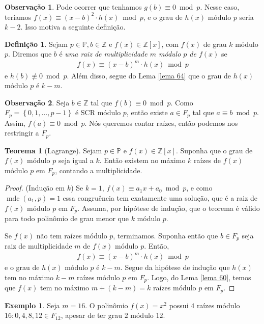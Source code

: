\documentclass[a4paper,11pt,twoside, leqno]{article}
\DeclareMathOperator{\mdc}{mdc}
\theoremstyle{definition}
\newtheorem{theorem}{Teorema}[section]
\newtheorem*{definition}{Definição}
\newtheorem{remark}{Observação}[section]
\newtheorem*{example}{Exemplo}
\begin{document}
\begin{remark}
	Pode ocorrer que tenhamos $g(b)\equiv 0\bmod p$. Nesse caso, teríamos $f(x)\equiv (x-b)^2\cdot h(x)\bmod p$, e o grau de $h(x)$ módulo $p$ seria $k-2$. Isso motiva a seguinte definição.
\end{remark}
\begin{definition}
	Sejam $p\in\mathbb{P}, b\in\mathbb{Z}$ e $f(x)\in\mathbb{Z}[x]$, com $f(x)$ de grau $k$ módulo $p$. Diremos que $b$ é {\em uma raiz de multiplicidade $m$ módulo $p$ de $f(x)$} se 
	\begin{align*}
	f(x)\equiv (x-b)^m\cdot h(x)\bmod p
	\end{align*}
	e $h(b)\not\equiv 0\bmod p$. Além disso, segue do Lema \eqref{lema 64} que o grau de $h(x)$ módulo $p$ é $k-m$.
\end{definition}
\begin{remark}
	Seja $b\in\mathbb{Z}$ tal que $f(b)\equiv 0\bmod p$. Como $F_p = \left\{ 0,1,\dots,p-1 \right\}$ é SCR módulo $p$, então existe $a\in F_p$ tal que $a\equiv b\bmod p$. Assim, $f(a)\equiv 0\bmod p$. Nós queremos contar raízes, então podemos nos restringir a $F_p$.
\end{remark}
\begin{theorem}[Lagrange]
	Sejam $p\in\mathbb{P}$ e $f(x)\in\mathbb{Z}[x]$. Suponha que o grau de $f(x)$ módulo $p$ seja igual a $k$. Então existem no máximo $k$ raízes de $f(x)$ módulo $p$ em $F_p$, contando a multiplicidade.
\end{theorem}
\begin{proof}
(Indução em $k$) Se $k=1$, $f(x)\equiv a_1x + a_0\bmod p$, e como $\mdc(a_1,p) = 1$ essa congruência tem exatamente uma solução, que é a raiz de $f(x)$ módulo $p$ em $F_p$. Assuma, por hipótese de indução, que o teorema é válido para todo polinômio de grau menor que $k$ módulo $p$.
\par\vspace{0.3cm} Se $f(x)$ não tem raízes módulo $p$, terminamos. Suponha então que $b\in F_p$ seja raiz de multiplicidade $m$ de $f(x)$ módulo $p$. Então,
\begin{align*}
f(x)\equiv (x-b)^m\cdot h(x)\bmod p
\end{align*}
e o grau de $h(x)$ módulo $p$ é $k-m$. Segue da hipótese de indução que $h(x)$ tem no máximo $k-m$ raízes módulo $p$ em $F_p$. Logo, do Lema \eqref{lema 60}, temos que $f(x)$ tem no máximo $m + (k-m) = k$ raízes módulo $p$ em $F_p$.
\end{proof}
\begin{example}
	Seja $m=16$. O polinômio $f(x) = x^2$ possui $4$ raízes módulo $16: 0,4,8,12\in F_{12}$, apesar de ter grau $2$ módulo $12$.
\end{example}
\end{document}
